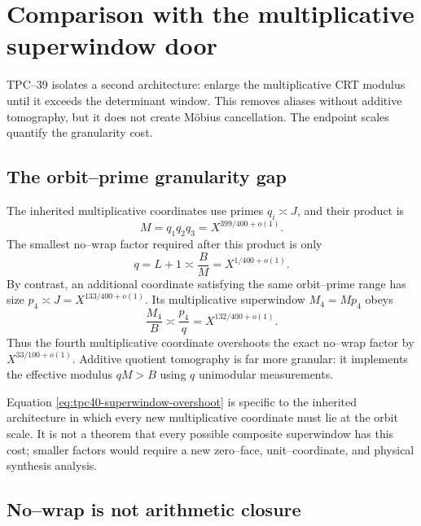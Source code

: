 \section{Comparison with the multiplicative superwindow door}
\label{sec:tpc40-superwindow}

TPC--39 isolates a second architecture: enlarge the multiplicative CRT
modulus until it exceeds the determinant window.  This removes aliases
without additive tomography, but it does not create M\"obius cancellation.
The endpoint scales quantify the granularity cost.

\subsection{The orbit--prime granularity gap}

The inherited multiplicative coordinates use primes
\(q_i\asymp J\), and their product is
\begin{equation}
 M=q_1q_2q_3=X^{399/400+o(1)}.
 \label{eq:tpc40-superwindow-M}
\end{equation}
The smallest no--wrap factor required after this product is only
\begin{equation}
 q=L+1\asymp\frac BM=X^{1/400+o(1)}.
 \label{eq:tpc40-superwindow-additive-factor}
\end{equation}
By contrast, an additional coordinate satisfying the same orbit--prime
range has size \(p_4\asymp J=X^{133/400+o(1)}\).  Its multiplicative
superwindow \(M_4=Mp_4\) obeys
\begin{equation}
 \frac{M_4}{B}
 \asymp\frac{p_4}{q}
 =X^{132/400+o(1)}.
 \label{eq:tpc40-superwindow-overshoot}
\end{equation}
Thus the fourth multiplicative coordinate overshoots the exact no--wrap
factor by \(X^{33/100+o(1)}\).  Additive quotient tomography is far more
granular: it implements the effective modulus \(qM>B\) using \(q\)
unimodular measurements.

Equation \eqref{eq:tpc40-superwindow-overshoot} is specific to the
inherited architecture in which every new multiplicative coordinate must
lie at the orbit scale.  It is not a theorem that every possible composite
superwindow has this cost; smaller factors would require a new zero--face,
unit--coordinate, and physical synthesis analysis.

\subsection{No--wrap is not arithmetic closure}

